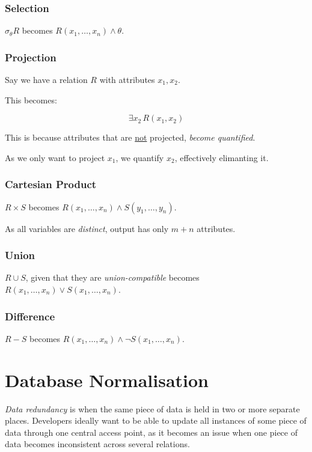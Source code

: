 \documentclass{article}
\begin{document}
\subsubsection{Selection}

$\sigma_{\theta} R$ becomes $R(x_1, \ldots, x_n) \wedge \theta$.

\subsubsection{Projection}

Say we have a relation $R$ with attributes $x_1, x_2$.

This becomes:

\[ \exists x_2\, R(x_1, x_2)\]

This is because attributes that are \underline{not} projected, \textit{become quantified}.

As we only want to project $x_1$, we quantify $x_2$, effectively elimanting it.

\subsubsection{Cartesian Product}

$R \times S$ becomes $R(x_1, \ldots, x_n) \wedge S(y_1, \ldots, y_n)$.

As all variables are \textit{distinct}, output has only $m + n$ attributes.

\subsubsection{Union}

$R \cup S$, given that they are \textit{union-compatible} becomes $R(x_1, \ldots, x_n) \vee S(x_1, \ldots, x_n)$.

\subsubsection{Difference}

$R - S$ becomes $R(x_1, \ldots, x_n) \wedge \neg S(x_1, \ldots, x_n)$.

\section{Database Normalisation}

\textit{Data redundancy} is when the same piece of data is held in two or more separate places. Developers ideally want to be able to update all instances of some piece of data through one central access point, as it becomes an issue when one piece of data becomes inconsistent across several relations.
\end{document}
